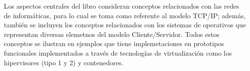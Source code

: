 Los aspectos centrales del libro consideran conceptos relacionados con las redes de informáticas, para lo cual se toma como referente al modelo TCP/IP; además, también se incluyen
los conceptos relacionados con los sistemas de operativos que representan diversas elemetnos del modelo Cliente/Servidor. Todos estos conceptos se ilustran en ejemplos que tiene implemetaciones en prototipos funcionales implementados a través de tecnologías de virtualización como los hipervisores (tipo 1 y 2) y  contenedores.









